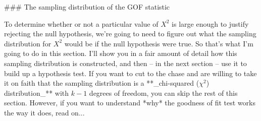 ### The sampling distribution of the GOF statistic \advanced

To determine whether or not a particular value of $X^2$ is large enough to justify rejecting the null hypothesis, we're going to need to figure out what the sampling distribution for $X^2$ would be if the null hypothesis were true. So that's what I'm going to do in this section. I'll show you in a fair amount of detail how this sampling distribution is constructed, and then -- in the next section -- use it to build up a hypothesis test. If you want to cut to the chase and are willing to take it on faith that the sampling distribution is a **_chi-squared ($\chi^2$) distribution_** with $k-1$ degrees of freedom, you can skip the rest of this section. However, if you want to understand *why* the goodness of fit test works the way it does, read on...

